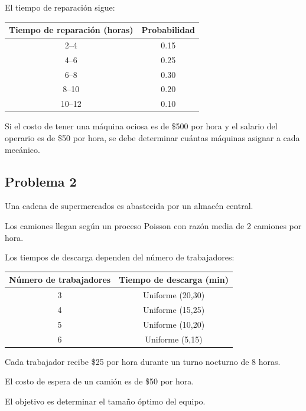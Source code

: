 \documentclass[12pt]{article}
\begin{document}
El tiempo de reparación sigue:

\begin{center}
\begin{tabular}{cc}
\toprule
Tiempo de reparación (horas) & Probabilidad \\
\midrule
2--4   & 0.15 \\
4--6   & 0.25 \\
6--8   & 0.30 \\
8--10  & 0.20 \\
10--12 & 0.10 \\
\bottomrule
\end{tabular}
\end{center}

Si el costo de tener una máquina ociosa es de \$500 por hora y el salario del operario es de \$50 por hora, se debe determinar cuántas máquinas asignar a cada mecánico.

\subsection{Problema 2}

Una cadena de supermercados es abastecida por un almacén central.

Los camiones llegan según un proceso Poisson con razón media de 2 camiones por hora.

Los tiempos de descarga dependen del número de trabajadores:

\begin{center}
\begin{tabular}{cc}
\toprule
Número de trabajadores & Tiempo de descarga (min) \\
\midrule
3 & Uniforme (20,30) \\
4 & Uniforme (15,25) \\
5 & Uniforme (10,20) \\
6 & Uniforme (5,15) \\
\bottomrule
\end{tabular}
\end{center}

Cada trabajador recibe \$25 por hora durante un turno nocturno de 8 horas.

El costo de espera de un camión es de \$50 por hora.

El objetivo es determinar el tamaño óptimo del equipo.
\end{document}
